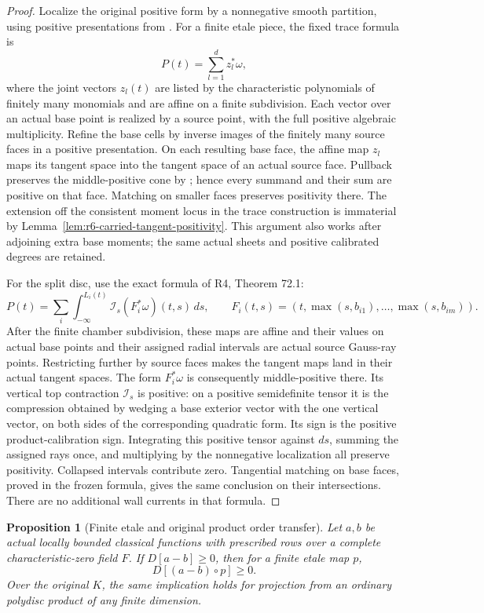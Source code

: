 \documentclass[11pt,a4paper]{article}
\numberwithin{equation}{section}
\newtheorem{proposition}[theorem]{Proposition}
\theoremstyle{definition}
\theoremstyle{remark}
\begin{document}
\begin{proof}
Localize the original positive form by a nonnegative smooth partition,
using positive presentations from \cite[Definition 5.3.1]{CLD12}.
For a finite etale piece, the fixed trace formula is
\[
                        P(t)=\sum_{l=1}^d z_l^*\omega,
\]
where the joint vectors $z_l(t)$ are listed by the characteristic
polynomials of finitely many monomials and are affine on a finite
subdivision. Each vector over an actual base point is realized by
a source point, with the full positive algebraic multiplicity.
Refine the base cells by inverse images of the finitely many source
faces in a positive presentation. On each resulting base face, the
affine map $z_l$ maps its tangent space into the tangent space of
an actual source face. Pullback preserves the middle-positive cone
by \cite[Remark 5.1.5]{CLD12}; hence every summand and their sum
are positive on that face. Matching on smaller faces preserves
positivity there. The extension off the consistent moment locus in
the trace construction is immaterial by
Lemma~\ref{lem:r6-carried-tangent-positivity}. This argument also
works after adjoining extra base moments; the same actual sheets
and positive calibrated degrees are retained.

For the split disc, use the exact formula of R4, Theorem 72.1:
\[
 P(t)=\sum_i\int_{-\infty}^{L_i(t)}
            \mathcal I_s(F_i^*\omega)(t,s)\,ds,
 \qquad
 F_i(t,s)=(t,\max(s,b_{i1}),\ldots,\max(s,b_{im})).
\]
After the finite chamber subdivision, these maps are affine and
their values on actual base points and their assigned radial intervals
are actual source Gauss-ray points. Restricting further by source
faces makes the tangent maps land in their actual tangent spaces.
The form $F_i^*\omega$ is consequently middle-positive there.
Its vertical top contraction $\mathcal I_s$ is positive: on a
positive semidefinite tensor it is the compression obtained by
wedging a base exterior vector with the one vertical vector, on
both sides of the corresponding quadratic form. Its sign is the
positive product-calibration sign. Integrating this positive tensor
against $ds$, summing the assigned rays once, and multiplying by
the nonnegative localization all preserve positivity. Collapsed
intervals contribute zero. Tangential matching on base faces, proved
in the frozen formula, gives the same conclusion on their intersections.
There are no additional wall currents in that formula.
\end{proof}

\begin{proposition}[Finite etale and original product order transfer]
\label{prop:r6-finite-etale-product-order}
Let $a,b$ be actual locally bounded classical functions with
prescribed rows over a complete characteristic-zero field $F$.
If $D[a-b]\geq0$, then for a finite etale map $p$,
\[
                         D[(a-b)\circ p]\geq0.
\]
Over the original $K$, the same implication holds for projection
from an ordinary polydisc product of any finite dimension.
\end{proposition}
\end{document}
